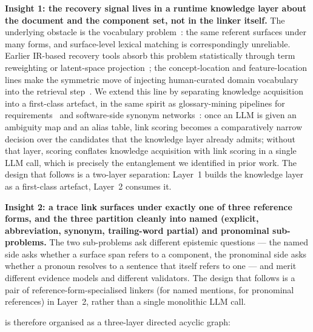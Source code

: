 \textbf{Insight 1: the recovery signal lives in a runtime knowledge layer about the document and the component set, not in the linker itself.}
The underlying obstacle is the vocabulary problem~\cite{furnas1987vocabulary}: the same referent surfaces under many forms, and surface-level lexical matching is correspondingly unreliable.
Earlier IR-based recovery tools absorb this problem statistically through term reweighting or latent-space projection~\cite{antoniol2002recovering,marcus2003recovering,delucia2009assessing}; the concept-location and feature-location lines make the symmetric move of injecting human-curated domain vocabulary into the retrieval step~\cite{rajlich2002role,dit2013feature}.
We extend this line by separating knowledge acquisition into a first-class artefact, in the same spirit as glossary-mining pipelines for requirements~\cite{arora2017automated,gemkow2018automatic} and software-side synonym networks~\cite{howard2013automatically,falleri2010automatic}: once an \ac{LLM} is given an ambiguity map and an alias table, link scoring becomes a comparatively narrow decision over the candidates that the knowledge layer already admits; without that layer, scoring conflates knowledge acquisition with link scoring in a single \ac{LLM} call, which is precisely the entanglement we identified in prior work.
The design that follows is a two-layer separation: Layer~1 builds the knowledge layer as a first-class artefact, Layer~2 consumes it.

\textbf{Insight 2: a trace link surfaces under exactly one of three reference forms, and the three partition cleanly into named (explicit, abbreviation, synonym, trailing-word partial) and pronominal sub-problems.}
The two sub-problems ask different epistemic questions --- the named side asks whether a surface span refers to a component, the pronominal side asks whether a pronoun resolves to a sentence that itself refers to one --- and merit different evidence models and different validators.
The design that follows is a pair of reference-form-specialised linkers (\linkerB for named mentions, \linkerC for pronominal references) in Layer~2, rather than a single monolithic \ac{LLM} call.

\approach is therefore organised as a three-layer directed acyclic graph:

